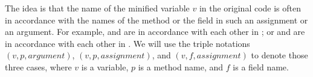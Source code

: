 %
%

The idea is that the name of the minified variable $v$ in the original
code is often in accordance with the names of the method or the field
in such an assignment or an argument. For example,  and
 are in accordance with each other in ; or  and
 are in accordance with each other in
.  We will use the
triple notations $(v, p, argument)$, $(v, p, assignment)$, and
$(v, f, assignment)$ to denote those three cases, where $v$ is a
variable, $p$ is a method name, and $f$ is a field name.







